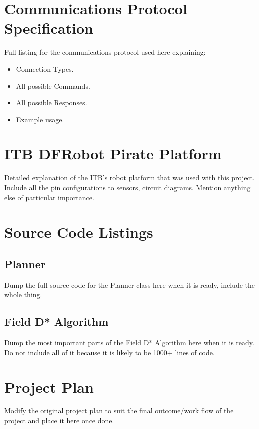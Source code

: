 \appendix
{}

\section{Communications Protocol Specification}\label{Appendix: Communications Protocol Specification} 
Full listing for the communications protocol used here explaining:


\begin{itemize}
\item Connection Types.
\item All possible Commands.
\item All possible Responses.
\item Example usage.
\end{itemize}

\newpage

\section{ITB DFRobot Pirate Platform}\label{Appendix: ITB DFRobot Pirate Platform}
Detailed explanation of the ITB's robot platform that was used with this project. Include all the pin configurations to sensors, circuit diagrams. Mention anything else of particular importance.

\newpage

\section{Source Code Listings}\label{Appendix: Source Code Listings}

\subsection{Planner}\label{Appendix: Planner}
Dump the full source code for the Planner class here when it is ready, include the whole thing.

\subsection{Field D* Algorithm}\label{Appendix: Field D* Algorithm}
Dump the most important parts of the Field D* Algorithm here when it is ready. Do not include all of it because it is likely to be 1000+ lines of code.

\section{Project Plan}
Modify the original project plan to suit the final outcome/work flow of the project and place it here once done.

